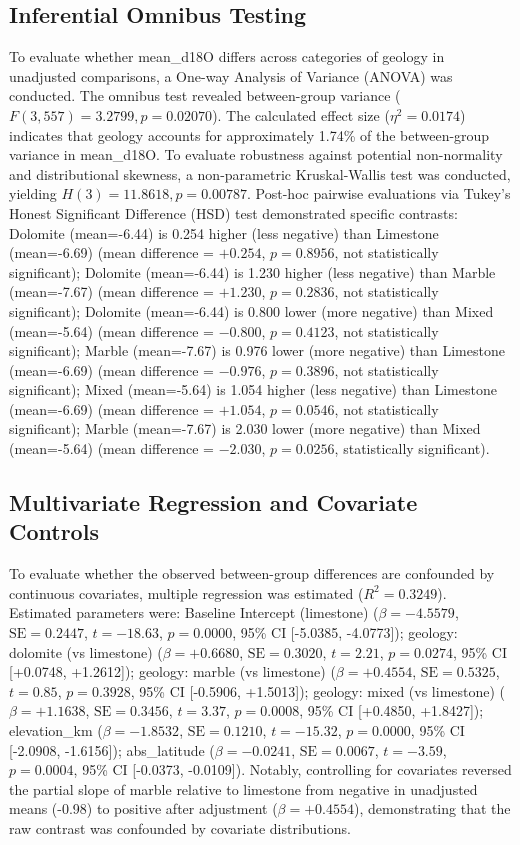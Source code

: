\documentclass[sn-basic,Numbered]{sn-jnl}%
\begin{document}
\subsection{Inferential Omnibus Testing}
To evaluate whether mean\_d18O differs across categories of geology in unadjusted comparisons, a One-way Analysis of Variance (ANOVA) was conducted. The omnibus test revealed between-group variance ($F(3, 557) = 3.2799, p = 0.02070$). The calculated effect size ($\eta^2 = 0.0174$) indicates that geology accounts for approximately 1.74\% of the between-group variance in mean\_d18O. To evaluate robustness against potential non-normality and distributional skewness, a non-parametric Kruskal-Wallis test was conducted, yielding $H(3) = 11.8618, p = 0.00787$. Post-hoc pairwise evaluations via Tukey's Honest Significant Difference (HSD) test demonstrated specific contrasts: Dolomite (mean=-6.44) is 0.254 higher (less negative) than Limestone (mean=-6.69) (mean difference = $+0.254$, $p = 0.8956$, not statistically significant); Dolomite (mean=-6.44) is 1.230 higher (less negative) than Marble (mean=-7.67) (mean difference = $+1.230$, $p = 0.2836$, not statistically significant); Dolomite (mean=-6.44) is 0.800 lower (more negative) than Mixed (mean=-5.64) (mean difference = $-0.800$, $p = 0.4123$, not statistically significant); Marble (mean=-7.67) is 0.976 lower (more negative) than Limestone (mean=-6.69) (mean difference = $-0.976$, $p = 0.3896$, not statistically significant); Mixed (mean=-5.64) is 1.054 higher (less negative) than Limestone (mean=-6.69) (mean difference = $+1.054$, $p = 0.0546$, not statistically significant); Marble (mean=-7.67) is 2.030 lower (more negative) than Mixed (mean=-5.64) (mean difference = $-2.030$, $p = 0.0256$, statistically significant).

\subsection{Multivariate Regression and Covariate Controls}
To evaluate whether the observed between-group differences are confounded by continuous covariates, multiple regression was estimated ($R^2 = 0.3249$). Estimated parameters were: Baseline Intercept (limestone) ($\beta = -4.5579$, $\text{SE} = 0.2447$, $t = -18.63$, $p = 0.0000$, 95\% CI [-5.0385, -4.0773]); geology: dolomite (vs limestone) ($\beta = +0.6680$, $\text{SE} = 0.3020$, $t = 2.21$, $p = 0.0274$, 95\% CI [+0.0748, +1.2612]); geology: marble (vs limestone) ($\beta = +0.4554$, $\text{SE} = 0.5325$, $t = 0.85$, $p = 0.3928$, 95\% CI [-0.5906, +1.5013]); geology: mixed (vs limestone) ($\beta = +1.1638$, $\text{SE} = 0.3456$, $t = 3.37$, $p = 0.0008$, 95\% CI [+0.4850, +1.8427]); elevation\_km ($\beta = -1.8532$, $\text{SE} = 0.1210$, $t = -15.32$, $p = 0.0000$, 95\% CI [-2.0908, -1.6156]); abs\_latitude ($\beta = -0.0241$, $\text{SE} = 0.0067$, $t = -3.59$, $p = 0.0004$, 95\% CI [-0.0373, -0.0109]). Notably, controlling for covariates reversed the partial slope of marble relative to limestone from negative in unadjusted means (-0.98) to positive after adjustment ($\beta = +0.4554$), demonstrating that the raw contrast was confounded by covariate distributions.
\end{document}
